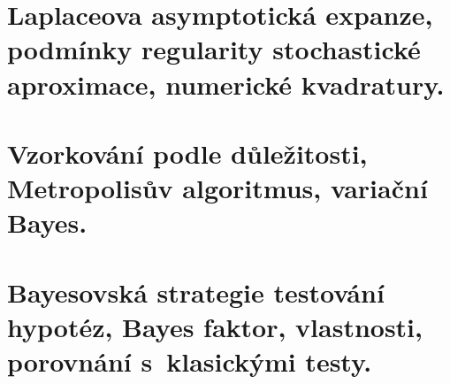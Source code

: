 \chapter{Laplaceova asymptotická expanze, podmínky regularity stochastické aproximace, numerické kvadratury.}


\chapter{Vzorkování podle důležitosti, Metropolisův algoritmus, variační Bayes.}


\chapter{Bayesovská strategie testování hypotéz, Bayes faktor, vlastnosti, porovnání s~klasickými testy.}


